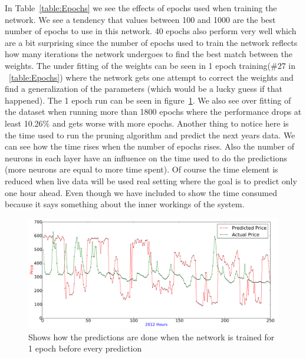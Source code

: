 In Table~\ref{table:Epochs} we see the effects of epochs used when training the network. We see a tendency that values between 100 and 1000 are the best number of epochs to use in this network. 40 epochs also perform very well which are a bit surprising since the number of epochs used to train the network reflects how many iterations the network undergoes to find the best match between the weights. The under fitting of the weights can be seen in 1 epoch training(\#27 in ~\ref{table:Epochs}) where the network gets one attempt to correct the weights and find a generalization of the parameters (which would be a lucky guess if that happened). The 1 epoch run can be seen in figure~\ref{fig:1epoch}. We also see over fitting of the dataset when running more than 1800 epochs where the performance drops at least 10.26\% and gets worse with more epochs. Another thing to notice here is the time used to run the pruning algorithm and predict the next years data. We can see how the time rises when the number of epochs rises. Also the number of neurons in each layer have an influence on the time used to do the predictions (more neurons are equal to more time spent). Of course the time element is reduced when live data will be used real setting where the goal is to predict only one hour ahead. Even though we have included to show the time consumed because it says something about the inner workings of the system.

\begin{figure}[H]
\centering
\includegraphics[width=\linewidth]{billeder/PriceExperimentalAnalysis/1EpochTraining.png}
\caption{Shows how the predictions are done when the network is trained for 1 epoch before every prediction}
\label{fig:1epoch}
\end{figure}

